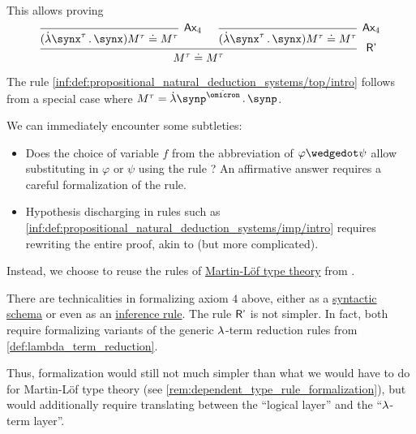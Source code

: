 \begin{remark}
\begin{thmenum}
    This allows proving
    \begin{equation*}
      \begin{prooftree}
        \infer0[\ensuremath{ \logic{Ax}_4 }]{ (\qabs {\synx^\tau} \synx) M^\tau \syneq M^\tau }
        \infer0[\ensuremath{ \logic{Ax}_4 }]{ (\qabs {\synx^\tau} \synx) M^\tau \syneq M^\tau }
        \infer2[\logic{ R' }]{ M^\tau \syneq M^\tau }
      \end{prooftree}
    \end{equation*}

    The rule \ref{inf:def:propositional_natural_deduction_systems/top/intro} follows from a special case where \( M^\tau = \qabs {\synp^{\syn\omicron}} \synp \).

    We can immediately encounter some subtleties:
    \begin{itemize}
      \item Does the choice of variable \( f \) from the abbreviation of \( \varphi \synwedge \psi \) allow substituting in \( \varphi \) or \( \psi \) using the rule ? An affirmative answer requires a careful formalization of the rule.

      \item Hypothesis discharging in rules such as \ref{inf:def:propositional_natural_deduction_systems/imp/intro} requires rewriting the entire proof, akin to  (but more complicated).
    \end{itemize}

    Instead, we choose to reuse the rules of \hyperref[def:martin_lof_type_theory]{Martin-L\"of type theory} from .
  \end{thmenum}
\end{remark}
\begin{comments}
  \item There are technicalities in formalizing axiom \( 4 \) above, either as a \hyperref[con:schemas_and_instances]{syntactic schema} or even as an \hyperref[def:inference_rule]{inference rule}. The rule \( \textsf{\upshape R'} \) is not simpler. In fact, both require formalizing variants of the generic \( {\mathrm \lambda} \)-term reduction rules from \cref{def:lambda_term_reduction}.

  Thus, formalization would still not much simpler than what we would have to do for Martin-L\"of type theory (see \cref{rem:dependent_type_rule_formalization}), but would additionally require translating between the \enquote{logical layer} and the \enquote{\( {\mathrm \lambda} \)-term layer}.
\end{comments}

